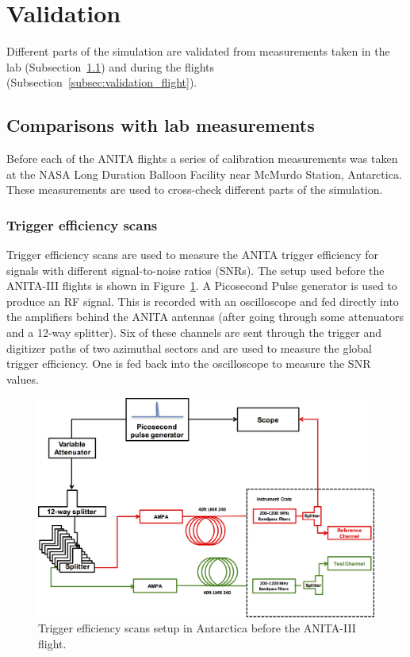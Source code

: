 \section{Validation}
\label{sec:validation}
Different parts of the simulation are validated from measurements
taken in the lab (Subsection~\ref{subsec:validation_lab}) and during
the flights (Subsection~\ref{subsec:validation_flight}).


\subsection{Comparisons with lab measurements}
\label{subsec:validation_lab}
Before each of the ANITA flights a series of calibration measurements was
taken at the NASA Long Duration Balloon Facility near McMurdo Station, Antarctica.
These measurements are used to cross-check different parts of the simulation.

\subsubsection{Trigger efficiency scans}
\label{subsec:validation_scans}
Trigger efficiency scans are used to measure the ANITA trigger efficiency
for signals with different signal-to-noise ratios (SNRs).
The setup used before the ANITA-III flights is shown in Figure~\ref{fig:scan_setup}. 
A Picosecond Pulse generator is used to produce an RF signal. 
This is recorded with an oscilloscope and fed directly into the
amplifiers  behind the ANITA antennas (after going through some attenuators and a 12-way splitter).
Six of these channels are sent through the trigger and digitizer paths of
two azimuthal sectors and
are used to measure the global trigger efficiency. 
One is fed back into the oscilloscope to measure the SNR values.

\begin{figure}[!h]\centering
  \includegraphics[width=.8\linewidth]{./Figs/TriggerEfficiencyScanSetup.png}
  \caption{Trigger efficiency scans setup in Antarctica before the ANITA-III flight.}
  \label{fig:scan_setup}
\end{figure}

